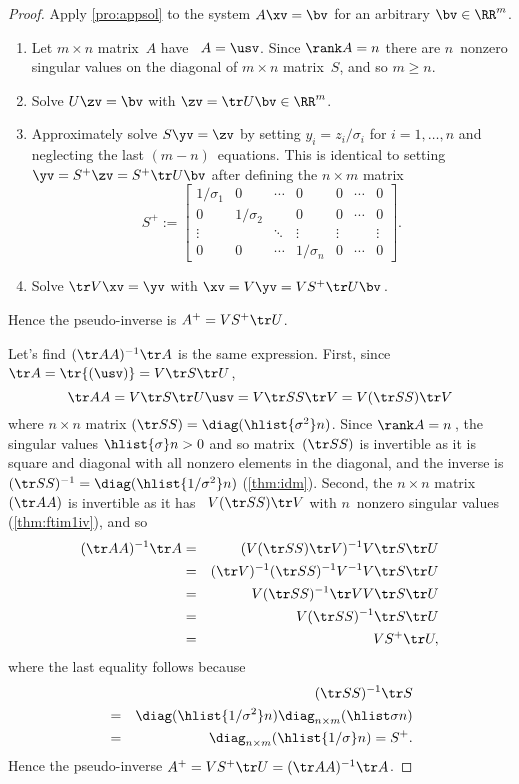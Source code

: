 \begin{proof} 
Apply \autoref{pro:appsol} to the system \(A\xv=\bv\) for an arbitrary \(\bv\in\RR^m\).
\begin{enumerate}
\item Let \(m\times n\) matrix~\(A\) have \svd\ \(A=\usv\).  
Since \(\rank A=n\) there are \(n\)~nonzero singular values on the diagonal of \(m\times n\) matrix~\(S\), and so \(m\geq n\).
\item Solve \(U\zv=\bv\) with \(\zv=\tr U\bv\in\RR^m\).
\item Approximately solve \(S\yv=\zv\) by setting \(y_i=z_i/\sigma_i\) for \(i=1,\ldots,n\) and neglecting the last \((m-n)\)~equations.
This is identical to setting \(\yv=S^+\zv=S^+\tr U\bv\) after defining the \(n\times m\) matrix
\begin{equation*}
S^+:=\begin{bmatrix} 1/\sigma_1&0&\cdots&0&0&\cdots&0
\\0&1/\sigma_2&&0&0&\cdots&0
\\\vdots&&\ddots&\vdots&\vdots&&\vdots
\\0&0&\cdots&1/\sigma_n&0&\cdots&0 \end{bmatrix}.
\end{equation*}
\item Solve \(\tr V\xv=\yv\) with \(\xv=V\yv=VS^+\tr U\bv\)\,.
\end{enumerate}
Hence the pseudo-inverse is \(A^+=VS^+\tr U\).

Let's find \((\tr AA)^{-1}\tr A\) is the same expression.
First, since \(\tr A=\tr{(\usv)}=V\tr S\tr U\),
\begin{equation*}
\tr AA=V\tr S\tr U\usv=V\tr SS\tr V=V(\tr SS)\tr V
\end{equation*}
where \(n\times n\) matrix \((\tr SS)=\diag(\hlist{\sigma^2}n)\).
Since \(\rank A=n\)\,, the singular values \(\hlist{\sigma}n>0\) and so matrix~\((\tr SS)\) is invertible as it is square and diagonal with all nonzero elements in the diagonal, and the inverse is \((\tr SS)^{-1}=\diag(\hlist{1/\sigma^2}n)\) (\autoref{thm:idm}).
Second, the \(n\times n\) matrix \((\tr AA)\) is invertible as it has \svd\ \(V(\tr SS)\tr V\) with \(n\)~nonzero singular values (\autoref{thm:ftim1iv}), and so
\begin{eqnarray*}
(\tr AA)^{-1}\tr A
&=&(V(\tr SS)\tr V)^{-1}V\tr S\tr U
\\&=&(\tr V)^{-1}(\tr SS)^{-1}V^{-1}V\tr S\tr U
\\&=&V(\tr SS)^{-1}\tr VV\tr S\tr U
\\&=&V(\tr SS)^{-1}\tr S\tr U
\\&=&VS^+\tr U,
\end{eqnarray*}
where the last equality follows because
\begin{eqnarray*}
&&(\tr SS)^{-1}\tr S
\\&=&\diag(\hlist{1/\sigma^2}n)\diag_{n\times m}(\hlist\sigma n)
\\&=&\diag_{n\times m}(\hlist{1/\sigma}n)=S^+.
\end{eqnarray*}
Hence the pseudo-inverse \(A^+=VS^+\tr U=(\tr AA)^{-1}\tr A\).
\end{proof}





